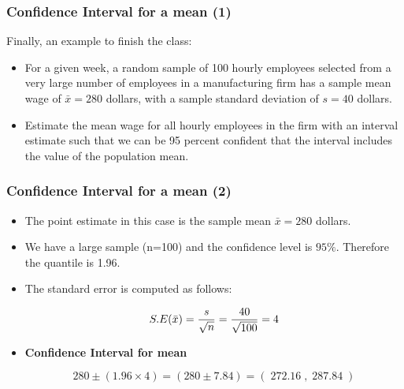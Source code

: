 \documentclass[a4]{beamer}
\begin{document}
\begin{frame}
\frametitle{Confidence Interval for a mean (1) }
Finally, an example to finish the class:
\begin{itemize}
\item For a given week, a random sample of 100 hourly employees selected from a very large number of
employees in a manufacturing firm has a sample mean wage of $\bar{x} = 280$ dollars, with a sample standard deviation of
$s = 40$ dollars.
\item Estimate the mean wage for all hourly employees in the firm with an interval estimate such that we can be 95
percent confident that the interval includes the value of the population mean.
\end{itemize}

\end{frame}
\begin{frame}
\frametitle{Confidence Interval for a mean (2) }

\begin{itemize}
\item The point estimate in this case is the sample mean $\bar{x} = 280$ dollars.
\item We have a large sample (n=100) and the confidence level is $95\%$. Therefore the quantile  is 1.96.
\item The standard error is computed as follows:

\[ S.E( \bar{x} )  = {s \over \sqrt{n}}  =  {40 \over \sqrt{100}} = 4  \]
\item \textbf{Confidence Interval for mean}

\[
280 \pm (1.96 \times 4)  = (280 \pm 7.84) = (\;272.16\;,\;287.84\;)
\]

\end{itemize}
\end{frame}
\end{document}
